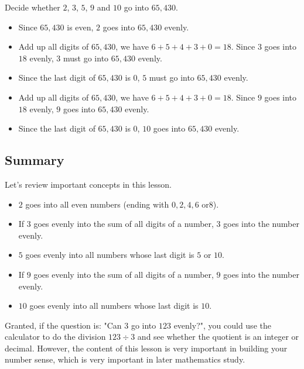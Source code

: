 \begin{myexample}
Decide whether $2$, $3$, $5$, $9$ and $10$ go into $65,430$.
\end{myexample}
\begin{solution}
\begin{itemize}
\item Since $65,430$ is even, $2$ goes into $65,430$ evenly.
\item Add up all digits of $65,430$, we have $6+5+4+3+0=18$. Since $3$ goes into $18$ evenly, $3$ must go into $65,430$ evenly.
\item Since the last digit of $65,430$ is $0$, $5$ must go into $65,430$ evenly.
\item Add up all digits of $65,430$, we have $6+5+4+3+0=18$. Since $9$ goes into $18$ evenly, $9$ goes into $65,430$ evenly.
\item Since the last digit of $65,430$ is $0$, $10$ goes into $65,430$ evenly.
\end{itemize}
\end{solution}

\subsection{Summary}
Let's review important concepts in this lesson.
\begin{itemize}
\item $2$ goes into all even numbers (ending with $0,2,4,6 \text{ or} 8$).
\item If $3$ goes evenly into the sum of all digits of a number, $3$ goes into the number evenly.
\item $5$ goes evenly into all numbers whose last digit is $5$ or $10$.
\item If $9$ goes evenly into the sum of all digits of a number, $9$ goes into the number evenly.
\item $10$ goes evenly into all numbers whose last digit is $10$.
\end{itemize}

Granted, if the question is: "Can $3$ go into $123$ evenly?", you could use the calculator to do the division $123\div3$ and see whether the quotient is an integer or decimal. However, the content of this lesson is very important in building your number sense, which is very important in later mathematics study.

